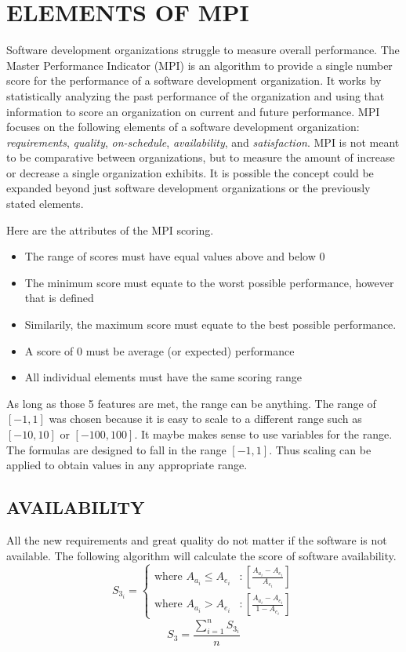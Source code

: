 \documentclass[SDSUThesis.tex]{subfiles}
\begin{document}
\section{ELEMENTS OF MPI}

Software development organizations struggle to measure overall performance.  The Master Performance Indicator (MPI) is an algorithm to provide a single number score for the performance of a software development organization. It works by statistically analyzing the past performance of the organization and using that information to score an organization on current and future performance.  MPI focuses on the following elements of a software development organization: \textit{requirements},  \textit{quality},  \textit{on-schedule},  \textit{availability}, and  \textit{satisfaction}. MPI is not meant to be comparative between organizations, but to measure the amount of increase or decrease a single organization exhibits.
It is possible the concept could be expanded beyond just software development organizations or the previously stated elements. 

Here are the attributes of the MPI scoring.
            \begin{itemize}
                \item The range of scores must have equal values above and below 0
                \item The minimum score must equate to the worst possible performance, however that is defined
                \item Similarily, the maximum score must equate to the best possible performance.  
                \item A score of 0 must be average (or expected) performance
                \item All individual elements must have the same scoring range
            \end{itemize}
            
            As long as those 5 features are met, the range can be anything.  The range of $[-1,1]$ was chosen because it is easy to scale to a different range such as $[-10,10]$ or $[-100,100]$.  It maybe makes sense to use variables for the range.  The formulas are designed to fall in the range $[-1,1]$.  Thus scaling can be applied to obtain values in any appropriate range. 
            
\subsection{AVAILABILITY}
All the new requirements and great quality do not matter if the software is not available.  
The following algorithm will calculate the score of software availability.
\begin{displaymath}
   S_{3_i} = \left\{
     \begin{array}{lr}
       \text{where } A_{a_i} \leq A_{e_i} & : \left[ \frac{A_{a_i} - A_{e_i}}{A_{e_i}} \right] \\
       \text{where } A_{a_i} > A_{e_i}  & : \left[ \frac{A_{a_i} - A_{e_i} }{1-A_{e_i}} \right]
     \end{array}
   \right.
\end{displaymath} 
\[
    S_3 = \frac{\sum^n_{i=1}S_{3_i}}{n}
\]
\end{document}
